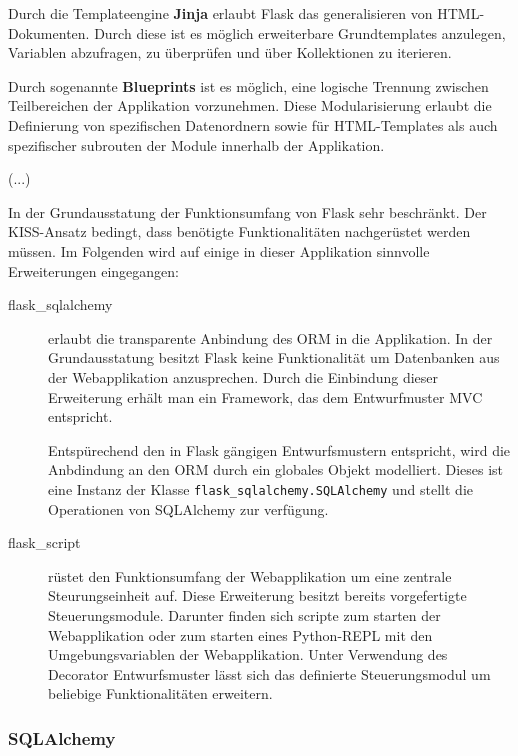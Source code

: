   Durch die Templateengine \textbf{Jinja} erlaubt Flask das generalisieren von HTML-Dokumenten. Durch diese ist es möglich erweiterbare Grundtemplates anzulegen, Variablen abzufragen, zu überprüfen und über Kollektionen zu iterieren.
   

   
  Durch sogenannte \textbf{Blueprints} ist es möglich, eine logische Trennung zwischen Teilbereichen der Applikation vorzunehmen. Diese Modularisierung erlaubt die Definierung von spezifischen Datenordnern sowie für HTML-Templates als auch spezifischer subrouten der Module innerhalb der Applikation.
  
  (...)
  

  In der Grundausstatung der Funktionsumfang von Flask sehr beschränkt. Der KISS-Ansatz bedingt, dass benötigte Funktionalitäten nachgerüstet werden müssen. Im Folgenden wird auf einige in dieser Applikation sinnvolle Erweiterungen eingegangen:
  
  \begin{description}
   \item [flask\_sqlalchemy] erlaubt die transparente Anbindung des ORM in die Applikation. In der Grundausstatung besitzt Flask keine Funktionalität um Datenbanken aus der Webapplikation anzusprechen. Durch die Einbindung dieser Erweiterung erhält man ein Framework, das dem Entwurfmuster MVC entspricht.
   
   Entspürechend den in Flask gängigen Entwurfsmustern entspricht, wird die Anbdindung an den ORM durch ein globales Objekt modelliert. Dieses ist eine Instanz der Klasse \texttt{flask\_sqlalchemy.SQLAlchemy} und stellt die Operationen von SQLAlchemy zur verfügung.
   
   \item [flask\_script] rüstet den Funktionsumfang der Webapplikation um eine zentrale Steurungseinheit auf. Diese Erweiterung besitzt bereits vorgefertigte Steuerungsmodule. Darunter finden sich scripte  zum starten der Webapplikation oder zum starten eines Python-REPL mit den Umgebungsvariablen der Webapplikation. Unter Verwendung des Decorator Entwurfsmuster lässt sich das definierte Steuerungsmodul um beliebige Funktionalitäten erweitern.
   
  \end{description}

    

    \subsubsection{SQLAlchemy}
    

